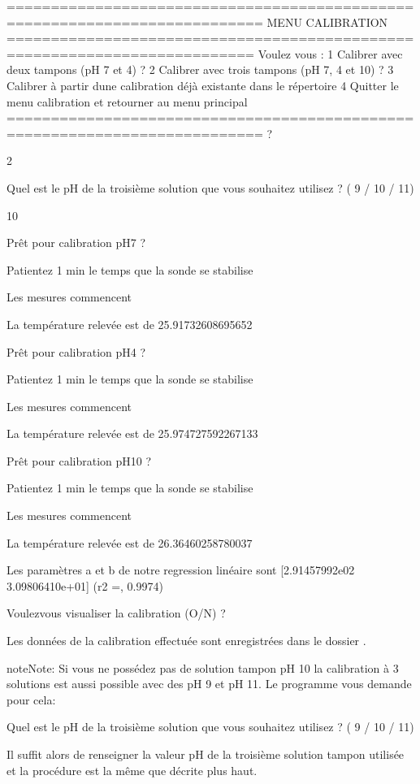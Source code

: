 \documentclass[letterpaper,10pt,french]{sphinxmanual}
\begin{document}
\begin{sphinxVerbatim}[commandchars=\\\{\}]
===========================================================================
MENU CALIBRATION
==========================================================================
Voulez \PYGZhy{} vous :
1 \PYGZhy{} Calibrer avec deux tampons (pH 7 et 4) ?
2 \PYGZhy{} Calibrer avec trois tampons (pH 7, 4 et 10) ?
3 \PYGZhy{} Calibrer à partir d\PYGZsq{}une calibration déjà existante dans le répertoire
4 \PYGZhy{} Quitter le menu calibration et retourner au menu principal
===========================================================================
?

\PYGZhy{}\PYGZgt{} 2

Quel est le pH de la troisième solution que vous souhaitez utilisez ? ( 9 / 10 / 11)

\PYGZhy{}\PYGZgt{} 10

Prêt pour calibration pH7 ?

Patientez 1 min le temps que la sonde se stabilise

Les mesures commencent

La température relevée est de 25.91732608695652

Prêt pour calibration pH4 ?

Patientez 1 min le temps que la sonde se stabilise

Les mesures commencent

La température relevée est de 25.974727592267133

Prêt pour calibration pH10 ?

Patientez 1 min le temps que la sonde se stabilise

Les mesures commencent

La température relevée est de 26.36460258780037

Les paramètres a et b de notre regression linéaire sont [\PYGZhy{}2.91457992e\PYGZhy{}02  3.09806410e+01]
(\PYGZsq{}r2 =\PYGZsq{}, 0.9974)

Voulez\PYGZhy{}vous visualiser la calibration (O/N) ?
\end{sphinxVerbatim}

\sphinxAtStartPar
Les données de la calibration effectuée sont enregistrées dans le dossier .

\begin{sphinxadmonition}{note}{Note:}
\sphinxAtStartPar
Si vous ne possédez pas de solution tampon pH 10 la calibration à 3 solutions est aussi possible avec des pH 9 et pH 11. Le programme vous demande pour cela:

\begin{sphinxVerbatim}[commandchars=\\\{\}]
Quel est le pH de la troisième solution que vous souhaitez utilisez ? ( 9 / 10 / 11)
\end{sphinxVerbatim}

\sphinxAtStartPar
Il suffit alors de renseigner la valeur pH de la troisième solution tampon utilisée et la procédure est la même que décrite plus haut.
\end{sphinxadmonition}
\end{document}
